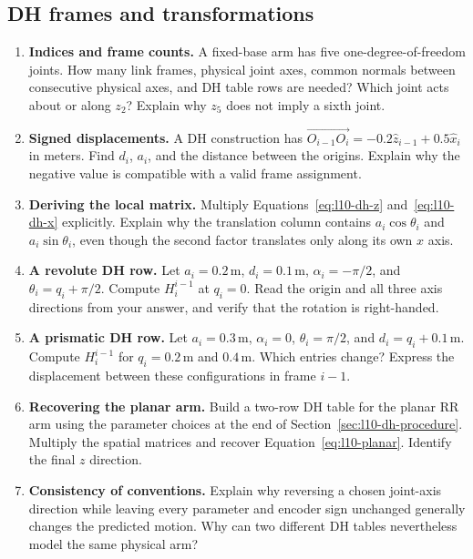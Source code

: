 \clearpage
\subsection{DH frames and transformations}
\begin{enumerate}
\item \textbf{Indices and frame counts.} A fixed-base arm has five
one-degree-of-freedom joints. How many link frames, physical joint axes,
common normals between consecutive physical axes, and DH table rows are
needed? Which joint acts about or along $z_2$? Explain why $z_5$ does not
imply a sixth joint.

\item \textbf{Signed displacements.} A DH construction has
$\overrightarrow{O_{i-1}O_i}=-0.2\hat z_{i-1}+0.5\hat x_i$ in meters.
Find $d_i$, $a_i$, and the distance between the origins. Explain why the
negative value is compatible with a valid frame assignment.

\item \textbf{Deriving the local matrix.} Multiply
Equations~\eqref{eq:l10-dh-z} and~\eqref{eq:l10-dh-x} explicitly.
Explain why the translation column contains $a_i\cos\theta_i$ and
$a_i\sin\theta_i$, even though the second factor translates only along
its own $x$ axis.

\item \textbf{A revolute DH row.} Let $a_i=0.2\,\mathrm m$,
$d_i=0.1\,\mathrm m$, $\alpha_i=-\pi/2$, and
$\theta_i=q_i+\pi/2$. Compute $H_i^{i-1}$ at $q_i=0$.
Read the origin and all three axis directions from your answer, and
verify that the rotation is right-handed.

\item \textbf{A prismatic DH row.} Let $a_i=0.3\,\mathrm m$,
$\alpha_i=0$, $\theta_i=\pi/2$, and $d_i=q_i+0.1\,\mathrm m$.
Compute $H_i^{i-1}$ for $q_i=0.2\,\mathrm m$ and $0.4\,\mathrm m$.
Which entries change? Express the displacement between these configurations
in frame $i-1$.

\item \textbf{Recovering the planar arm.} Build a two-row DH table for
the planar RR arm using the parameter choices at the end of
Section~\ref{sec:l10-dh-procedure}. Multiply the spatial matrices and
recover Equation~\eqref{eq:l10-planar}. Identify the final $z$ direction.

\item \textbf{Consistency of conventions.} Explain why reversing a
chosen joint-axis direction while leaving every parameter and encoder
sign unchanged generally changes the predicted motion. Why can two
different DH tables nevertheless model the same physical arm?
\end{enumerate}


